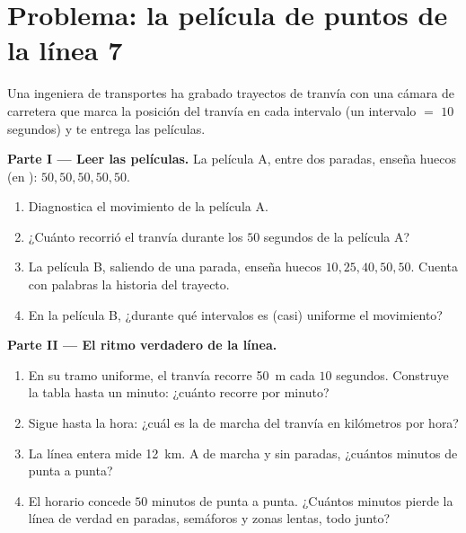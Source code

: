 \section{Problema: la película de puntos de la línea 7}

\begin{problem}\label{pb:g6:describing-motion:1}
Una ingeniera de transportes ha grabado trayectos de tranvía con una
cámara de carretera que marca la posición del tranvía en cada
intervalo (un intervalo $=$ $10$ segundos) y te entrega las películas.

\medskip\noindent\textbf{Parte I --- Leer las películas.}
La película A, entre dos paradas, enseña huecos (en
): $50, 50, 50, 50, 50$.
\begin{enumerate}
  \item Diagnostica el movimiento de la película A.
  \item ¿Cuánto recorrió el tranvía durante los $50$ segundos de la
        película A?
  \item La película B, saliendo de una parada, enseña huecos
        $10, 25, 40, 50, 50$. Cuenta con palabras la historia del
        trayecto.
  \item En la película B, ¿durante qué intervalos es (casi) uniforme
        el movimiento?
\end{enumerate}

\medskip\noindent\textbf{Parte II --- El ritmo verdadero de la línea.}
\begin{enumerate}[resume]
  \item En su tramo uniforme, el tranvía recorre \qty{50}{m} cada
        $10$ segundos. Construye la tabla hasta un minuto: ¿cuánto
        recorre por minuto?
  \item Sigue hasta la hora: ¿cuál es la  de marcha del
        tranvía en kilómetros por hora?
  \item La línea entera mide \qty{12}{km}. A  de marcha y
        sin paradas, ¿cuántos minutos de punta a punta?
  \item El horario concede $50$ minutos de punta a punta. ¿Cuántos
        minutos pierde la línea de verdad en paradas, semáforos y
        zonas lentas, todo junto?
\end{enumerate}


\end{problem}
